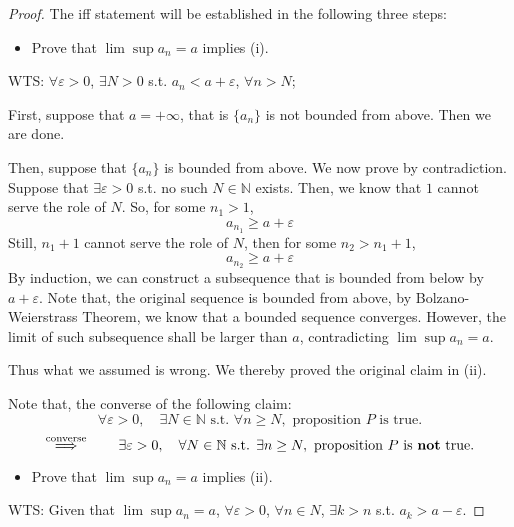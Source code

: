 \documentclass[12pt]{article}
\newcommand{\N}{{\mathbb N}}
\theoremstyle{definition}
\theoremstyle{plain}
\begin{document}
\begin{proof} The iff statement will be established in the following three steps:
    \begin{itemize}
        \item Prove that $\lim\sup a_n = a$ implies (i).
    \end{itemize}
    WTS: $\forall \varepsilon > 0$, $\exists N > 0$ s.t. $a_n < a + 
        \varepsilon$, $\forall n > N$;

        First, suppose that $a = +\infty$, that is $\{a_n\}$ is not bounded from 
        above. Then we are done.

        Then, suppose that $\{a_n\}$ is bounded from above. We now prove by 
        contradiction. Suppose that $\exists \varepsilon > 0$ s.t. no such $N 
        \in \N$ exists. Then, we know that $1$ cannot serve the role of $N$. 
        So, for some $n_1 > 1$, 
        \[
            a_{n_1} \ge a + \varepsilon
        \]
        Still, $n_1 + 1$ cannot serve the role of $N$, then for some $n_2 > n_1 
        + 1$, 
        $$a_{n_2} \ge a + \varepsilon$$
        By induction, we can construct a subsequence that is bounded from below by 
        $a + \varepsilon$. Note that, the original sequence is bounded from 
        above, by Bolzano-Weierstrass Theorem, we know that a bounded sequence 
        converges. However, the limit of such subsequence shall be larger than $a$, 
        contradicting $\lim\sup a_n = a$.

        Thus what we assumed is wrong. We thereby proved the original claim in 
        (ii).
    \begin{mdframed}
        Note that, the converse of the following claim: 
        \[
            \forall \varepsilon > 0, \quad \exists N \in \N \text{ s.t. } 
            \forall n \ge N, \text{ proposition } P \text{ is true.}
        \]
        \[
            \overset{\text{converse}} \implies \qquad 
            \exists \varepsilon > 0, \quad \forall N \in \N \text{ s.t. } 
            \exists n \ge N, \text{ proposition } P \text{ is \textbf{not} true.}
        \]
    \end{mdframed}


    \begin{itemize}
        \item Prove that $\lim\sup a_n = a$ implies (ii).
    \end{itemize}
    WTS: Given that $\lim\sup a_n = a$,
    $\forall \varepsilon > 0$, $\forall n \in N$, $\exists k > n$ s.t. 
        $a_k > a - \varepsilon$.


\end{proof}
\end{document}
